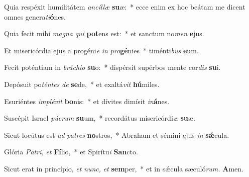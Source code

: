 \item Quia respéxit humilitátem \textit{ancíllæ} \textbf{su}æ:~* ecce enim ex hoc beátam me dicent omnes genera\hspace{0.03em}\textit{ti}\textbf{ó}nes.
\item Quia fecit mihi \textit{magna} \textit{qui} \textbf{pot}ens est:~* et sanctum no\textit{men} \textbf{e}jus.
\item Et misericórdia ejus a progéni\textit{e} \textit{in} \textit{pro}\textbf{gé}nies~* timénti\textit{bus} \textbf{e}um.
\item Fecit poténtiam in \textit{bráchio} \textbf{su}o:~* dispérsit supérbos mente cor\textit{dis} \textbf{su}i.
\item Depósuit po\textit{téntes} \textit{de} \textbf{se}de,~* et exaltá\textit{vit} \textbf{hú}miles.
\item Esuriéntes \textit{implévit} \textbf{bo}nis:~* et dívites dimísit \textit{in}\textbf{á}nes.
\item Suscépit Israel \textit{púerum} \textbf{su}um,~* recordátus misericórdi\hspace{0.03em}\textit{æ} \textbf{su}æ.
\item Sicut locútus est \textit{ad} \textit{patres} \textbf{no}stros,~* Abraham et sémini ejus \textit{in} \textbf{sǽ}cula.
\item Glória \textit{Patri,} \textit{et} \textbf{Fí}lio,~* et Spirítu\hspace{0.03em}\textit{i} \textbf{San}cto.
\item Sicut erat in princípio, \textit{et} \textit{nunc,} \textit{et} \textbf{sem}per,~* et in sǽcula sæculó\textit{rum.} \textbf{A}men.